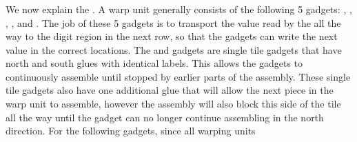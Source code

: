 \subsubsection{\warpunit}

%
We now explain the {\warpunit}.
%
A warp unit generally consists of the following 5 gadgets: \prewarp, \firstwarp, \warpbridge, \secondwarp, and \postwarp.
%
The job of these 5 gadgets is to transport the value read by the {\cread} all the way to the digit region in the next row, so that the {\cwrite} gadgets can write the next value in the correct locations.
%
The {\firstwarp} and {\secondwarp} gadgets are single tile gadgets that have north and south glues with identical labels.
%
This allows the gadgets to continuously assemble until stopped by earlier parts of the assembly.
%
These single tile gadgets also have one additional glue that will allow the next piece in the warp unit to assemble, however the assembly will also block this side of the tile all the way until the gadget can no longer continue assembling in the north direction.
%
For the following gadgets, since all warping units

